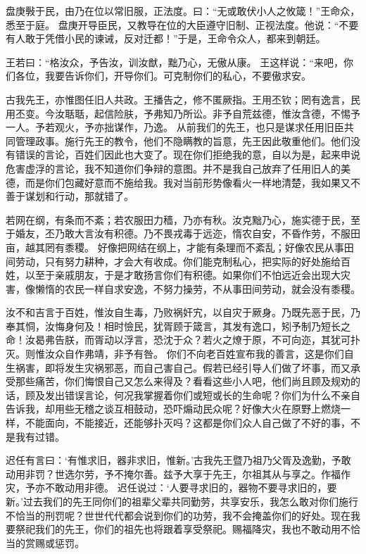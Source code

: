 \documentclass[a4paper,12pt,UTF8,twoside]{ctexbook}
\begin{document}
盘庚斅于民，由乃在位以常旧服，正法度。曰：“无或敢伏小人之攸箴！”王命众，悉至于庭。
盘庚开导臣民，又教导在位的大臣遵守旧制、正视法度。他说：“不要有人敢于凭借小民的谏诫，反对迁都！”于是，王命令众人，都来到朝廷。

王若曰：“格汝众，予告汝，训汝猷，黜乃心，无傲从康。
王这样说：“来吧，你们各位，我要告诉你们，开导你们。可克制你们的私心，不要傲求安。

古我先王，亦惟图任旧人共政。王播告之，修不匿厥指。王用丕钦；罔有逸言，民用丕变。今汝聒聒，起信险肤，予弗知乃所讼。非予自荒兹德，惟汝含德，不惕予一人。予若观火，予亦拙谋作，乃逸。
从前我们的先王，也只是谋求任用旧臣共同管理政事。施行先王的教令，他们不隐瞒教的旨意，先王因此敬重他们。他们没有错误的言论，百姓们因此也大变了。现在你们拒绝我的意，自以为是，起来申说危害虚浮的言论，我不知道你们争辩的意图。并不是我自己放弃了任用旧人的美德，而是你们包藏好意而不施给我。我对当前形势像看火一样地清楚，我如果又不善于谋划和行动，那就错了。

若网在纲，有条而不紊；若农服田力穑，乃亦有秋。汝克黜乃心，施实德于民，至于婚友，丕乃敢大言汝有积德。乃不畏戎毒于远迩，惰农自安，不昏作劳，不服田亩，越其罔有黍稷。
好像把网结在纲上，才能有条理而不紊乱；好像农民从事田间劳动，只有努力耕种，才会大有收成。你们能克制私心，把实际的好处施给百姓，以至于亲戚朋友，于是才敢扬言你们有积德。如果你们不怕远近会出现大灾害，像懒惰的农民一样自求安逸，不努力操劳，不从事田间劳动，就会没有黍稷。

汝不和吉言于百姓，惟汝自生毒，乃败祸奸宄，以自灾于厥身。乃既先恶于民，乃奉其恫，汝悔身何及！相时憸民，犹胥顾于箴言，其发有逸口，矧予制乃短长之命！汝曷弗告朕，而胥动以浮言，恐沈于众？若火之燎于原，不可向迩，其犹可扑灭。则惟汝众自作弗靖，非予有咎。
你们不向老百姓宣布我的善言，这是你们自生祸害，即将发生灾祸邪恶，而自己害自己。假若已经引导人们做了坏事，而又承受那些痛苦，你们悔恨自己又怎么来得及？看看这些小人吧，他们尚且顾及规劝的话，顾及发出错误言论，何况我掌握着你们或短或长的生命呢？你们为什么不亲自告诉我，却用些无稽之谈互相鼓动，恐吓煽动民众呢？好像大火在原野上燃烧一样，不能面向，不能接近，还能够扑灭吗？这都是你们众人自己做了不好的事，不是我有过错。

迟任有言曰：‘有惟求旧，器非求旧，惟新。’古我先王暨乃祖乃父胥及逸勤，予敢动用非罚？世选尔劳，予不掩尔善。兹予大享于先王，尔祖其从与享之。作福作灾，予亦不敢动用非德。
迟任说过：‘人要寻求旧的，器物不要寻求旧的，要新。’过去我们的先王同你们的祖辈父辈共同勤劳，共享安乐，我怎么敢对你们施行不恰当的刑罚呢？世世代代都会说到你们的功劳，我不会掩盖你们的好处。现在我要祭祀我们的先王，你们的祖先也将跟着享受祭祀。赐福降灾，我也不敢动用不恰当的赏赐或惩罚。
\end{document}
